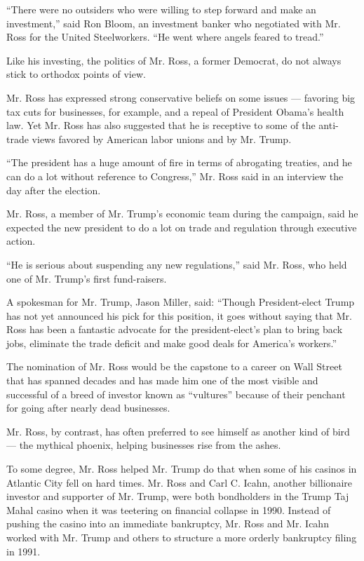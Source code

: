 ``There were no outsiders who were willing to step forward and make an
investment,'' said Ron Bloom, an investment banker who negotiated with
Mr. Ross for the United Steelworkers. ``He went where angels feared to
tread.''

Like his investing, the politics of Mr. Ross, a former Democrat, do not
always stick to orthodox points of view.

Mr. Ross has expressed strong conservative beliefs on some issues ---
favoring big tax cuts for businesses, for example, and a repeal of
President Obama's health law. Yet Mr. Ross has also suggested that he is
receptive to some of the anti-trade views favored by American labor
unions and by Mr. Trump.

``The president has a huge amount of fire in terms of abrogating
treaties, and he can do a lot without reference to Congress,'' Mr. Ross
said in an interview the day after the election.

Mr. Ross, a member of Mr. Trump's economic team during the campaign,
said he expected the new president to do a lot on trade and regulation
through executive action.

``He is serious about suspending any new regulations,'' said Mr. Ross,
who held one of Mr. Trump's first fund-raisers.

A spokesman for Mr. Trump, Jason Miller, said: ``Though President-elect
Trump has not yet announced his pick for this position, it goes without
saying that Mr. Ross has been a fantastic advocate for the
president-elect's plan to bring back jobs, eliminate the trade deficit
and make good deals for America's workers.''

The nomination of Mr. Ross would be the capstone to a career on Wall
Street that has spanned decades and has made him one of the most visible
and successful of a breed of investor known as ``vultures'' because of
their penchant for going after nearly dead businesses.

Mr. Ross, by contrast, has often preferred to see himself as another
kind of bird --- the mythical phoenix, helping businesses rise from the
ashes.

To some degree, Mr. Ross helped Mr. Trump do that when some of his
casinos in Atlantic City fell on hard times. Mr. Ross and Carl C. Icahn,
another billionaire investor and supporter of Mr. Trump, were both
bondholders in the Trump Taj Mahal casino when it was teetering on
financial collapse in 1990. Instead of pushing the casino into an
immediate bankruptcy, Mr. Ross and Mr. Icahn worked with Mr. Trump and
others to structure a more orderly bankruptcy filing in 1991.

